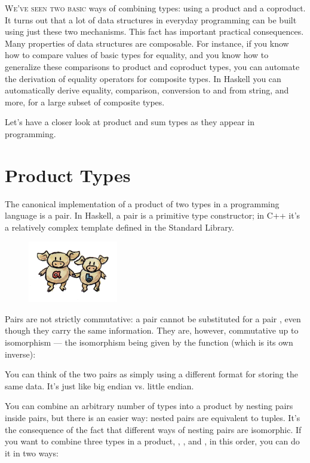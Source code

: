 
\lettrine[lhang=0.17]{W}{e've seen two basic} ways of combining types: using a product and a
coproduct. It turns out that a lot of data structures in everyday
programming can be built using just these two mechanisms. This fact has
important practical consequences. Many properties of data structures are
composable. For instance, if you know how to compare values of basic
types for equality, and you know how to generalize these comparisons to
product and coproduct types, you can automate the derivation of equality
operators for composite types. In Haskell you can automatically derive
equality, comparison, conversion to and from string, and more, for a
large subset of composite types.

Let's have a closer look at product and sum types as they appear in
programming.

\section{Product Types}

The canonical implementation of a product of two types in a programming
language is a pair. In Haskell, a pair is a primitive type constructor;
in C++ it's a relatively complex template defined in the Standard
Library.

\begin{figure}[H]
  \centering
  \includegraphics[width=0.35\textwidth]{images/pair.jpg}
\end{figure}

\noindent
Pairs are not strictly commutative: a pair  cannot
be substituted for a pair , even though they carry
the same information. They are, however, commutative up to isomorphism
--- the isomorphism being given by the  function (which is
its own inverse):

You can think of the two pairs as simply using a different format for
storing the same data. It's just like big endian vs. little endian.

You can combine an arbitrary number of types into a product by nesting
pairs inside pairs, but there is an easier way: nested pairs are
equivalent to tuples. It's the consequence of the fact that different
ways of nesting pairs are isomorphic. If you want to combine three types
in a product, , , and , in this order, you
can do it in two ways:

